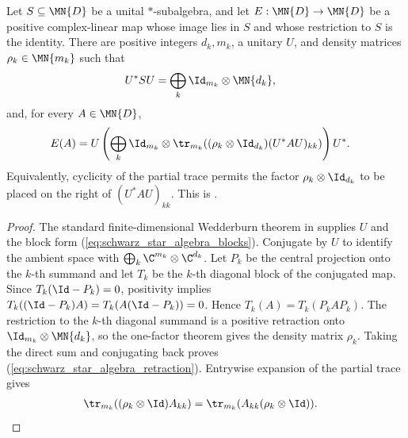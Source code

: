 \begin{theorem}
    \label{thm:positive_retraction_finite_star_algebra}
    \leanok
    Let $S\subseteq\MN{D}$ be a unital $*$-subalgebra, and let
    $E:\MN{D}\to\MN{D}$ be a positive complex-linear map whose image lies in
    $S$ and whose restriction to $S$ is the identity. There are positive
    integers $d_k,m_k$, a unitary $U$, and density matrices
    $\rho_k\in\MN{m_k}$ such that
    \begin{align}
        U^*SU
         & =\bigoplus_k \Id_{m_k}\otimes\MN{d_k},
        \label{eq:schwarz_star_algebra_blocks}
    \end{align}
    and, for every $A\in\MN{D}$,
    \begin{align}
        E(A)
         & =U\left(\bigoplus_k \Id_{m_k}\otimes
             \tr_{m_k}\!\left((\rho_k\otimes\Id_{d_k})(U^*AU)_{kk}\right)\right)U^*.
        \label{eq:schwarz_star_algebra_retraction}
    \end{align}
    Equivalently, cyclicity of the partial trace permits the factor
    $\rho_k\otimes\Id_{d_k}$ to be placed on the right of $(U^*AU)_{kk}$.
    This is \cite[Proposition~1.5 and Equation~(1.40)]{Wolf2012Quantum}.
\end{theorem}

\begin{proof}
    \leanok
    The standard finite-dimensional Wedderburn theorem in
    \cite[Proposition~1.5]{Wolf2012Quantum} supplies $U$ and the block form
    (\ref{eq:schwarz_star_algebra_blocks}). Conjugate by $U$ to identify the
    ambient space with
    $\bigoplus_k\C^{m_k}\otimes\C^{d_k}$. Let $P_k$ be the central projection
    onto the $k$-th summand and let $T_k$ be the $k$-th diagonal block of the
    conjugated map. Since $T_k(\Id-P_k)=0$, positivity implies
    $T_k((\Id-P_k)A)=T_k(A(\Id-P_k))=0$.
    Hence $T_k(A)=T_k(P_kAP_k)$. The restriction to the $k$-th diagonal
    summand is a positive retraction onto
    $\Id_{m_k}\otimes\MN{d_k}$, so the one-factor theorem gives the density
    matrix $\rho_k$. Taking the direct sum and conjugating back proves
    (\ref{eq:schwarz_star_algebra_retraction}). Entrywise expansion of the
    partial trace gives
    \begin{align}
        \tr_{m_k}((\rho_k\otimes\Id)A_{kk})
         & =\tr_{m_k}(A_{kk}(\rho_k\otimes\Id)).
        \notag
    \end{align}
\end{proof}


